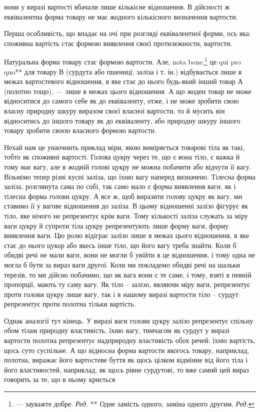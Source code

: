 \parcont{}  %
нони у виразі вартості вбачали лише кількісне відношення. В дійсності ж еквівалентна форма товару не
має жодного кількісного визначення вартости.

Перша особливість, що впадає на очі при розгляді еквівалентної форми, ось яка: споживна вартість
стає формою виявлення своєї протилежности, вартости.

Натуральна форма товару стає формою вартости. Але, nota bene,\footnote*{
— зауважте добре. \emph{Ред.}
** Одне замість одного, заміна одного другим. \emph{Ред.}
} це qui pro quo** для товару В
(сурдута або пшениці, заліза і т. ін.) відбувається лише в межах вартостевого відношення, в яке стає
до нього будь-який інший товар А (полотно тощо), — лише в межах цього відношення. А що жоден товар
не може відноситися до самого себе як до еквіваленту, отже, і не може зробити свою власну природну
шкуру виразом своєї власної вартости, то й мусить він відноситись до іншого товару як до
еквіваленту, або природну шкуру іншого товару зробити своєю власного формою вартости.

Нехай нам це унаочнить приклад міри, якою виміряється товарові тіла як такі, тобто як споживні
вартості. Голова цукру через те, що є вона тіло, є важка й тому має вагу, але в жодній голові цукру
не можна побачити або відчути її вагу. Візьмімо тепер різні кусні заліза, що їхню вагу наперед
визначено. Тілесна форма заліза, розглянута сама по собі, так само мало є форма виявлення ваги, як і
тілесна форма голови цукру. А все ж, щоб виразити голову цукру як вагу, ми ставимо її у вагове
відношення до заліза. В цьому відношенні залізо фігурує як тіло, яке нічого не репрезентує крім
ваги. Тому кількості заліза служать за міру ваги цукру й супроти тіла цукру репрезентують лише форму
ваги, форму виявлення ваги. Цю ролю відіграє залізо лише в межах цього відношення, в яке стає до
нього цукор або якесь інше тіло, що його вагу треба знайти. Коли б обидві речі не мали ваги, вони не
могли б увійти в це відношення, і тому одна не могла б бути за вираз ваги другої. Коли ми покладемо
обидві речі на шальки терезів, то ми дійсно побачимо, що як вага вони є те саме, і тому, взяті в
певній пропорції, мають ту саму вагу. Як тіло – залізо, являючи міру ваги, репрезентує проти голови
цукру лише вагу, так і в нашому виразі вартости тіло – сурдут репрезентує проти полотна тільки
вартість.

Однак аналогії тут кінець. У виразі ваги голови цукру залізо репрезентує спільну обом тілам природну
властивість, їхню вагу, тимчасом як сурдут у виразі вартости полотна репрезентує надприродну
властивість обох речей: їхню вартість, щось суто суспільне. А що відносна форма вартости якогось
товару, наприклад,
полотна, виражає його вартостеве буття як щось цілком відмінне від його тіла і його властивостей,
наприклад, як щось рівне сурдутові, то вже самий цей вираз говорить за те, що в ньому криється
\parbreak{}  %
